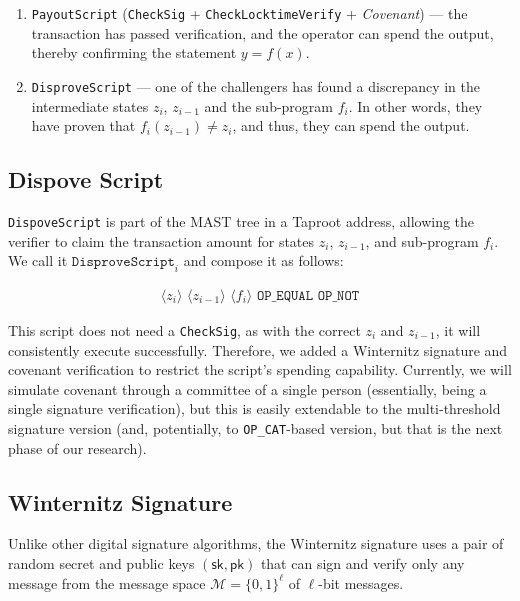 \documentclass{iacrtrans}
\newcommand{\elem}[1]{\, \langle #1 \rangle \,}
\newcommand{\opcode}[1]{\, \texttt{#1} \,}
\begin{document}
\begin{enumerate}
  \item \texttt{PayoutScript} (\texttt{CheckSig} + \texttt{CheckLocktimeVerify} + \textit{Covenant}) --- the transaction has passed verification, and the operator can spend the output, thereby confirming the statement $y=f(x)$.
  \item \texttt{DisproveScript} --- one of the challengers has found a discrepancy in the intermediate states \(z_i\), \(z_{i-1}\) and the sub-program \(f_i\). In other words, they have proven that \(f_i(z_{i-1}) \neq z_i\), and thus, they can spend the output.
\end{enumerate}

\subsection{Dispove Script}\label{sec:dispove-script}

\texttt{DispoveScript} is part of the MAST tree in a Taproot address, allowing the verifier to claim the transaction amount for states
\(z_i\), \(z_{i-1}\), and sub-program \(f_i\). We call it
\(\mathtt{DisproveScript}_i\) and compose it as follows:

\begin{empheqboxed}
\begin{align*}
    \elem{z_i} \elem{z_{i-1}} \elem{f_i} \opcode{OP\_EQUAL} \opcode{OP\_NOT}
\end{align*}
\end{empheqboxed}

This script does not need a \texttt{CheckSig}, as with the correct \(z_i\) and \(z_{i-1}\), it will consistently execute successfully. Therefore, we added a Winternitz signature and covenant verification to restrict the script's spending capability. Currently, we will simulate covenant through a committee of a single person (essentially, being a single signature verification), but this is easily extendable to the multi-threshold signature version (and, potentially, to \texttt{OP\_CAT}-based version, but that is the next phase of our research).

\subsection{Winternitz Signature}\label{sec:lamport-signature}

Unlike other digital signature algorithms, the Winternitz signature
uses a pair of random secret and public keys
$(\mathsf{sk}, \mathsf{pk})$ that can sign and verify only any message
from the message space \(\mathcal{M} = {\{0, 1\}}^{\ell}\) of
$\ell$-bit messages.
\end{document}
